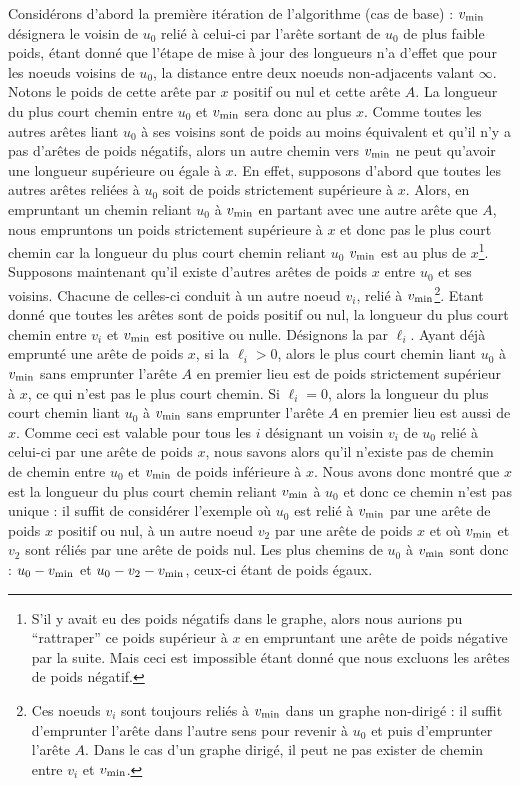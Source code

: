 Considérons d'abord la première itération de l'algorithme (cas de base) : $v_\mathrm{min}$ désignera le voisin de $u_0$ relié à celui-ci par l'arête sortant de $u_0$ de plus faible poids, étant donné que l'étape de mise à jour des longueurs n'a d'effet que pour les noeuds voisins de $u_0$, la distance entre deux noeuds non-adjacents valant $\infty$.
Notons le poids de cette arête par $x$ positif ou nul et cette arête $A$.
La longueur du plus court chemin entre $u_0$ et $v_\mathrm{min}$ sera donc au plus $x$.
Comme toutes les autres arêtes liant $u_0$ à ses voisins sont de poids au moins équivalent et qu'il n'y a pas d'arêtes de poids négatifs, alors un autre chemin vers $v_\mathrm{min}$ ne peut qu'avoir une longueur supérieure ou égale à $x$.
En effet, supposons d'abord que toutes les autres arêtes reliées à $u_0$ soit de poids strictement supérieure à $x$.
Alors, en empruntant un chemin reliant $u_0$ à $v_\mathrm{min}$ en partant avec une autre arête que $A$, nous empruntons un poids strictement supérieure à $x$ et donc pas le plus court chemin car la longueur du plus court chemin reliant $u_0$  $v_\mathrm{min}$ est au plus de $x$\footnote{S'il y avait eu des poids négatifs dans le graphe, alors nous aurions pu ``rattraper'' ce poids supérieur à $x$ en empruntant une arête de poids négative par la suite.
Mais ceci est impossible étant donné que nous excluons les arêtes de poids négatif.}.
Supposons maintenant qu'il existe d'autres arêtes de poids $x$ entre $u_0$ et ses voisins.
Chacune de celles-ci conduit à un autre noeud $v_i$, relié à $v_\mathrm{min}$\footnote{Ces noeuds $v_i$ sont toujours reliés à $v_\mathrm{min}$ dans un graphe non-dirigé : il suffit d'emprunter l'arête dans l'autre sens pour revenir à $u_0$ et puis d'emprunter l'arête $A$.
Dans le cas d'un graphe dirigé, il peut ne pas exister de chemin entre $v_i$ et $v_\mathrm{min}$.}.
Etant donné que toutes les arêtes sont de poids positif ou nul, la longueur du plus court chemin entre $v_i$ et $v_\mathrm{min}$ est positive ou nulle.
Désignons la par $\ell_i$.
Ayant déjà emprunté une arête de poids $x$, si la $\ell_i > 0$, alors le plus court chemin liant $u_0$ à $v_\mathrm{min}$ sans emprunter l'arête $A$ en premier lieu est de poids strictement supérieur à $x$, ce qui n'est pas le plus court chemin.
Si $\ell_i = 0$, alors la longueur du plus court chemin liant $u_0$ à $v_\mathrm{min}$ sans emprunter l'arête $A$ en premier lieu est aussi de $x$.
Comme ceci est valable pour tous les $i$ désignant un voisin $v_i$ de $u_0$ relié à celui-ci par une arête de poids $x$, nous savons alors qu'il n'existe pas de chemin de chemin entre $u_0$ et $v_\mathrm{min}$ de poids inférieure à $x$.
Nous avons donc montré que $x$ est la longueur du plus court chemin reliant $v_\mathrm{min}$ à $u_0$ et donc ce chemin n'est pas unique : il suffit de considérer l'exemple où $u_0$ est relié à $v_\mathrm{min}$ par une arête de poids $x$ positif ou nul, à un autre noeud $v_2$ par une arête de poids $x$ et où $v_\mathrm{min}$ et $v_2$ sont réliés par une arête de poids nul.
Les plus chemins de $u_0$ à $v_\mathrm{min}$ sont donc : $u_0 - v_\mathrm{min}$ et $u_0 - v_2 - v_\mathrm{min}$, ceux-ci étant de poids égaux.

